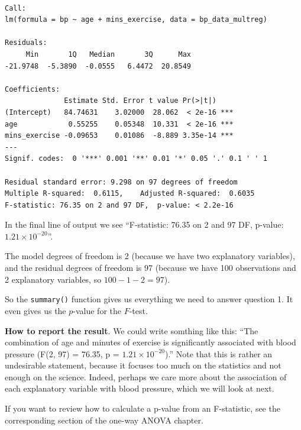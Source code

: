 \documentclass[
  letterpaper,
  8pt,
  a4paper]{book}
\begin{document}
\begin{verbatim}

Call:
lm(formula = bp ~ age + mins_exercise, data = bp_data_multreg)

Residuals:
     Min       1Q   Median       3Q      Max 
-21.9748  -5.3890  -0.0555   6.4472  20.8549 

Coefficients:
              Estimate Std. Error t value Pr(>|t|)    
(Intercept)   84.74631    3.02000  28.062  < 2e-16 ***
age            0.55255    0.05348  10.331  < 2e-16 ***
mins_exercise -0.09653    0.01086  -8.889 3.35e-14 ***
---
Signif. codes:  0 '***' 0.001 '**' 0.01 '*' 0.05 '.' 0.1 ' ' 1

Residual standard error: 9.298 on 97 degrees of freedom
Multiple R-squared:  0.6115,    Adjusted R-squared:  0.6035 
F-statistic: 76.35 on 2 and 97 DF,  p-value: < 2.2e-16
\end{verbatim}

In the final line of output we see ``F-statistic: 76.35 on 2 and 97 DF,
p-value: \ensuremath{1.21\times 10^{-20}}''.

The model degrees of freedom is 2 (because we have two explanatory
variables), and the residual degrees of freedom is 97 (because we have
100 observations and 2 explanatory variables, so \(100 - 1 - 2 = 97\)).

So the \texttt{summary()} function gives us everything we need to answer
question 1. It even gives us the \(p\)-value for the \(F\)-test.

\textbf{How to report the result}. We could write somthing like this:
``The combination of age and minutes of exercise is significantly
associated with blood pressure (F(2, 97) = 76.35, p =
\ensuremath{1.21\times 10^{-20}}).'' Note that this is rather an
undesirable statement, because it focuses too much on the statistics and
not enough on the science. Indeed, perhaps we care more about the
association of each explanatory variable with blood pressure, which we
will look at next.

\begin{tcolorbox}[enhanced jigsaw, arc=.35mm, bottomrule=.15mm, bottomtitle=1mm, breakable, colback=white, colbacktitle=quarto-callout-note-color!10!white, colframe=quarto-callout-note-color-frame, coltitle=black, left=2mm, leftrule=.75mm, opacityback=0, opacitybacktitle=0.6, rightrule=.15mm, title=\textcolor{quarto-callout-note-color}{\faInfo}\hspace{0.5em}{Note}, titlerule=0mm, toprule=.15mm, toptitle=1mm]

If you want to review how to calculate a p-value from an F-statistic,
see the corresponding section of the one-way ANOVA chapter.

\end{tcolorbox}
\end{document}
